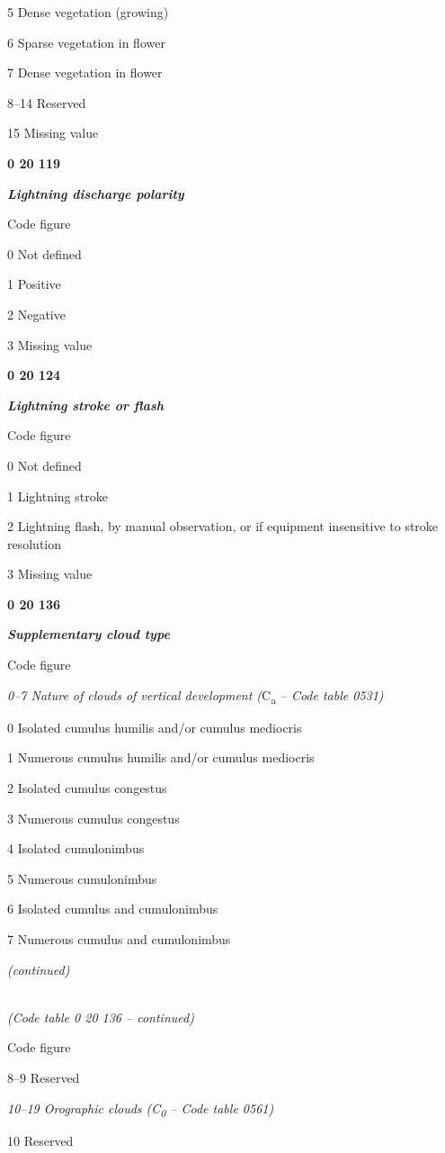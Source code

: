 5 Dense vegetation (growing)

6 Sparse vegetation in flower

7 Dense vegetation in flower

8--14 Reserved

15 Missing value

\textbf{0 20 119}

\emph{\textbf{Lightning discharge polarity}}

Code figure

0 Not defined

1 Positive

2 Negative

3 Missing value

\textbf{0 20 124}

\emph{\textbf{Lightning stroke or flash}}

Code figure

0 Not defined

1 Lightning stroke

2 Lightning flash, by manual observation, or if equipment insensitive to stroke resolution

3 Missing value

\textbf{0 20 136}

\emph{\textbf{Supplementary cloud type}}

Code figure

\emph{0--7 Nature of clouds of vertical development (}C\textsubscript{a} \emph{-- Code table 0531)}

0 Isolated cumulus humilis and/or cumulus mediocris

1 Numerous cumulus humilis and/or cumulus mediocris

2 Isolated cumulus congestus

3 Numerous cumulus congestus

4 Isolated cumulonimbus

5 Numerous cumulonimbus

6 Isolated cumulus and cumulonimbus

7 Numerous cumulus and cumulonimbus

\emph{(continued)}

\emph{\\
(Code table 0 20 136 -- continued)}

Code figure

8--9 Reserved

\emph{10--19 Orographic clouds (C\textsubscript{0} -- Code table 0561)}

10 Reserved

